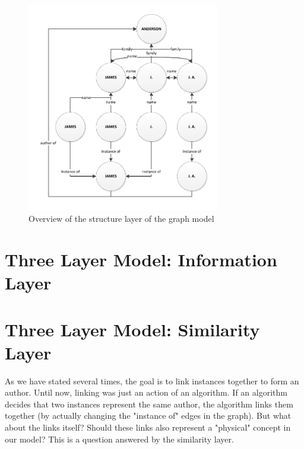 \begin{figure}[htb]
	\centering
		\includegraphics[width=0.75\textwidth]{fig/graphstructureoverview}
	\caption{Overview of the structure layer of the graph model}
	\label{fig:graphstructureoverview}
\end{figure}

\section{Three Layer Model: Information Layer}


\section{Three Layer Model: Similarity Layer}

As we have stated several times, the goal is to link instances together to form an author. Until now, linking was just an action of an algorithm. If an algorithm decides that two instances represent the same author, the algorithm links them together (by actually changing the "instance of" edges in the graph). But what about the links itself? Should these links also represent a "physical" concept in our model? This is a question answered by the similarity layer.


